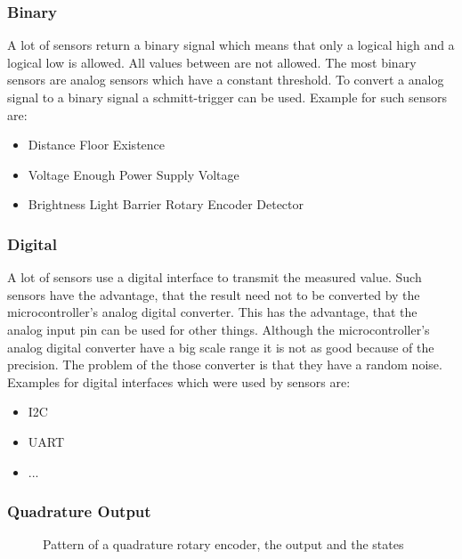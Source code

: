 \subsubsection{Binary}
A lot of sensors return a binary signal which means that only a logical high and a logical low is allowed.
All values between are not allowed.
The most binary sensors are analog sensors which have a constant threshold.
To convert a analog signal to a binary signal a schmitt-trigger can be used.
Example for such sensors are:
\begin{itemize}
\item Distance
\subitem Floor Existence
\item Voltage
\subitem Enough Power Supply Voltage
\item Brightness
\subitem Light Barrier
\subsubitem Rotary Encoder Detector 
\end{itemize}


\subsubsection{Digital}
A lot of sensors use a digital interface to transmit the measured value.
Such sensors have the advantage, that the result need not to be converted by the microcontroller's analog digital converter.
This has the advantage, that the analog input pin can be used for other things.
Although the microcontroller's analog digital converter have a big scale range it is not as good because of the precision.
The problem of the those converter is that they have a random noise.
Examples for digital interfaces which were used by sensors are:
\begin{itemize}
\item I2C
\item UART
\item ...
\end{itemize}


\subsubsection{Quadrature Output}


\begin{figure}
\caption{Pattern of a quadrature rotary encoder, the output and the states}
\label{fig:quadratureRotaryEncoder}
\end{figure}

